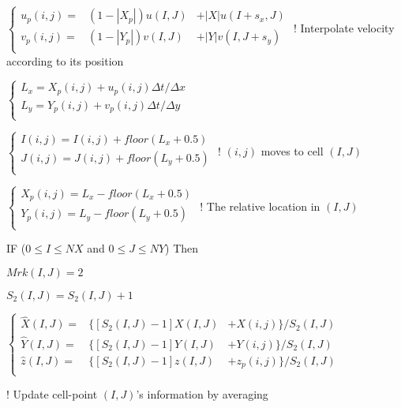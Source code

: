 \documentclass{article}
\theoremstyle{plain}\newtheorem{definition}{\sc{Definition}}
\theoremstyle{defination}\newtheorem{example}{Example}[section]
\numberwithin{equation}{section}
\numberwithin{table}{section}
\begin{document}
{{{ \hspace{1.5cm}	$\left\{
  \begin{array}{lll}
u_p(i,j)=&(1-|X_p|)u(I,J)&+|X|u(I+s_x,J)\\
v_p(i,j)=&(1-|Y_p|)v(I,J)&+|Y|v(I,J+s_y)\\
	\end{array}
	\right.$
 \hspace{0.5cm}
  \color{black!60} ! Interpolate velocity according to its position \color{black!80}


 \hspace{1.5cm}	$\left\{
  \begin{array}{l}
	L_x=X_p(i,j)+u_p(i,j)\Delta t/ \Delta x\\
    L_y=Y_p(i,j)+v_p(i,j)\Delta t/ \Delta y\\
	\end{array}
	\right.$

 \hspace{1.5cm}	$\left\{
  \begin{array}{l}
	I(i,j)=I(i,j)+floor(L_x+0.5)\\
    J(i,j)=J(i,j)+floor(L_y+0.5)\\
	\end{array}
	\right.$
  { \color{black!60} \hspace{2.3cm}
! $(i,j)$ moves to cell $(I,J)$} {\color{black!80}

 \hspace{1.5cm}	$\left\{
  \begin{array}{l}
	X_p(i,j)=L_x-floor(L_x+0.5)\\
    Y_p(i,j)=L_y-floor(L_y+0.5)\\
	\end{array}
	\right.$
	{ \color{black!60} \hspace{2.5cm}
! The relative location in $(I,J)$} {\color{black!80}

\vspace{0.1cm}
\hspace{1.5cm} \color{black!60!blue!80} IF
\color{black!70} ($0 \leqslant I \leqslant NX$ and $0 \leqslant J \leqslant NY$)
\color{black!60!blue!80} Then
\color{black!80}

\hspace{2.0cm} $Mrk(I,J)=2$

\hspace{2.0cm} $S_2(I,J)=S_2(I,J)+1$

\hspace{2.0cm}	$\left\{
  \begin{array}{rlr}
	\hat{X}(I,J)=&\{[S_2(I,J)-1]X(I,J)&+X(i,j)\}/S_2(I,J)\\  
	\hat{Y}(I,J)=&\{[S_2(I,J)-1]Y(I,J)&+Y(i,j)\}/S_2(I,J)\\
	\hat{z}(I,J)=&\{[S_2(I,J)-1]z(I,J)&+z_p(i,j)\}/S_2(I,J)\\
	\end{array}
	\right.$
  }
  \hspace{0cm}
  \begin{minipage}{7cm}
	\color{black!60}
! Update cell-point $(I,J)$'s 
 information by averaging 


\end{minipage}}}}}
\end{document}
